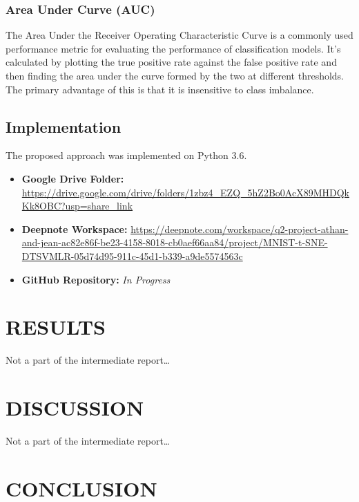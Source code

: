 \documentclass[12pt]{article}
\begin{document}
\subsubsection{Area Under Curve (AUC)}

The Area Under the Receiver Operating Characteristic Curve is a commonly used performance metric for evaluating the performance of classification models. It’s calculated by plotting the true positive rate against the false positive rate and then finding the area under the curve formed by the two at different thresholds. The primary advantage of this is that it is insensitive to class imbalance.

\subsection{Implementation}

The proposed approach was implemented on Python 3.6. 

\begin{itemize}
    \item \textbf{Google Drive Folder:}
    \newline \url{https://drive.google.com/drive/folders/1zbz4_EZQ_5hZ2Bo0AcX89MHDQkKk8OBC?usp=share_link}
    
    \item \textbf{Deepnote Workspace:}
    \newline
    \url{https://deepnote.com/workspace/q2-project-athan-and-jean-ac82e86f-be23-4158-8018-cb0aef66aa84/project/MNIST-t-SNE-DTSVMLR-05d74d95-911c-45d1-b339-a9de5574563c}
    
    \item \textbf{GitHub Repository:} 
    \newline
    \textit{In Progress}
\end{itemize}

\section{RESULTS}

Not a part of the intermediate report…

\section{DISCUSSION}

Not a part of the intermediate report…

\section{CONCLUSION}
\end{document}
